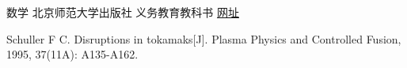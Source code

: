 \begin{thebibliography}{99}


   数学 北京师范大学出版社 义务教育教科书 \href{http://archive.keyllo.com/J-%E6%95%99%E8%82%B2/0-%E5%B0%8F%E5%AD%A6/%E5%B0%8F%E5%AD%A6%E6%95%B0%E5%AD%A6/%E5%8C%97%E5%B8%88%E5%A4%A7%E7%89%88/%e5%8c%97%e5%b8%88%e5%a4%a7%e4%b8%80%e5%b9%b4%e7%ba%a7%e6%95%b0%e5%ad%a6%e4%b8%8a%e5%86%8c.pdf}{网址}

   Schuller F C. Disruptions in tokamaks[J]. Plasma Physics and Controlled Fusion, 1995, 37(11A): A135-A162.

\end{thebibliography}